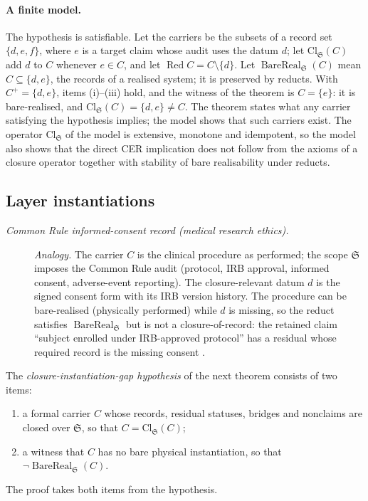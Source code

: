 \paragraph{A finite model.} The hypothesis is satisfiable. Let the carriers
be the subsets of a record set \(\{d,e,f\}\), where \(e\) is a target claim
whose audit uses the datum \(d\); let \(\mathrm{Cl}_{\mathfrak S}(C)\) add \(d\)
to \(C\) whenever \(e\in C\), and let \(\operatorname{Red}C=C\setminus\{d\}\). Let \(\operatorname{BareReal}_{\mathfrak S}(C)\) mean
\(C\subseteq\{d,e\}\), the records of a realised system; it is preserved by
reducts. With \(C^{+}=\{d,e\}\), items (i)--(iii) hold, and the witness of the
theorem is \(C=\{e\}\): it is bare-realised, and
\(\mathrm{Cl}_{\mathfrak S}(C)=\{d,e\}\ne C\). The theorem states what any
carrier satisfying the hypothesis implies; the model shows that such carriers
exist. The operator \(\mathrm{Cl}_{\mathfrak S}\) of the model is extensive,
monotone and idempotent, so the model also shows that the direct CER
implication does not follow from the axioms of a closure operator together
with stability of bare realisability under reducts.

\subsection*{Layer instantiations}\label{layer-inst:CER-direct}

\begingroup\small
\begin{description}
\item[\emph{Common Rule informed-consent record
(medical research ethics).}] \textit{Analogy.}
The carrier \(C\) is the clinical procedure as
performed; the scope \(\mathfrak S\) imposes the
Common Rule audit (protocol, IRB approval,
informed consent, adverse-event reporting).  The
closure-relevant datum \(d\) is the signed
consent form with its IRB version history.  The
procedure can be bare-realised (physically
performed) while \(d\) is missing, so the reduct
satisfies \(\operatorname{BareReal}_{\mathfrak S}\)
but is not a closure-of-record: the retained
claim ``subject enrolled under IRB-approved
protocol'' has a residual whose required record
is the missing consent \citep{DHHS2018CommonRule}.

\end{description}
\endgroup

The \emph{closure-instantiation-gap hypothesis} of the next theorem
consists of two items:
\begin{enumerate}[label=(\roman*),topsep=2pt,itemsep=1pt]
  \item a formal carrier \(C\) whose records, residual statuses, bridges
    and nonclaims are closed over \(\mathfrak S\), so that
    \(C=\mathrm{Cl}_{\mathfrak S}(C)\);
  \item a witness that \(C\) has no bare physical instantiation, so that
    \(\neg\operatorname{BareReal}_{\mathfrak S}(C)\).
\end{enumerate}
The proof takes both items from the hypothesis.

